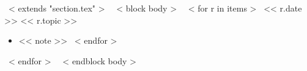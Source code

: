 ~< extends "section.tex" >~
~< block body >~
  ~< for r in items >~
    \cventry
      {<< r.date >>}
      {<< r.topic >>}
      {}{}{}{}

    \begin{itemize}
      ~< for note in r.notes >~
        \item{<< note >>}
      ~< endfor >~
    \end{itemize}

  ~< endfor >~
~< endblock body >~

